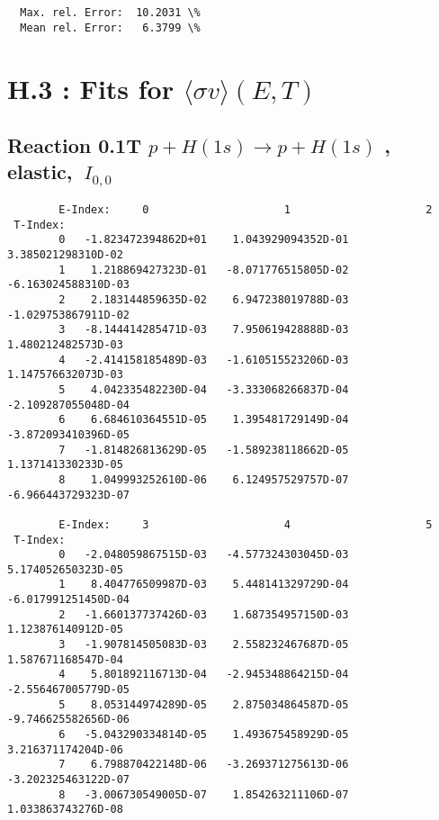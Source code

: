 \documentclass[12pt,dvipdfmx]{article}
\begin{document}
{\begin{small}
\begin{verbatim}
  Max. rel. Error:  10.2031 \%
  Mean rel. Error:   6.3799 \%

\end{verbatim}\end{small}
\newpage


\section{H.3 : Fits for $\langle\sigma v \rangle (E,T)$}\label{sect3}


\subsection{
Reaction 0.1T  $p + H(1s) \rightarrow  p + H(1s)$
, elastic,
$\  I_{0,0}$
}




\begin{small}\begin{verbatim}
        E-Index:     0                     1                     2
 T-Index:
        0   -1.823472394862D+01    1.043929094352D-01    3.385021298310D-02
        1    1.218869427323D-01   -8.071776515805D-02   -6.163024588310D-03
        2    2.183144859635D-02    6.947238019788D-03   -1.029753867911D-02
        3   -8.144414285471D-03    7.950619428888D-03    1.480212482573D-03
        4   -2.414158185489D-03   -1.610515523206D-03    1.147576632073D-03
        5    4.042335482230D-04   -3.333068266837D-04   -2.109287055048D-04
        6    6.684610364551D-05    1.395481729149D-04   -3.872093410396D-05
        7   -1.814826813629D-05   -1.589238118662D-05    1.137141330233D-05
        8    1.049993252610D-06    6.124957529757D-07   -6.966443729323D-07

        E-Index:     3                     4                     5
 T-Index:
        0   -2.048059867515D-03   -4.577324303045D-03    5.174052650323D-05
        1    8.404776509987D-03    5.448141329729D-04   -6.017991251450D-04
        2   -1.660137737426D-03    1.687354957150D-03    1.123876140912D-05
        3   -1.907814505083D-03    2.558232467687D-05    1.587671168547D-04
        4    5.801892116713D-04   -2.945348864215D-04   -2.556467005779D-05
        5    8.053144974289D-05    2.875034864587D-05   -9.746625582656D-06
        6   -5.043290334814D-05    1.493675458929D-05    3.216371174204D-06
        7    6.798870422148D-06   -3.269371275613D-06   -3.202325463122D-07
        8   -3.006730549005D-07    1.854263211106D-07    1.033863743276D-08


\end{verbatim}
\end{small}}
\end{document}
